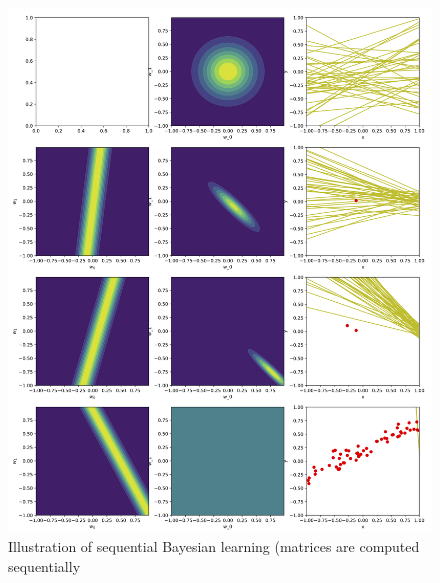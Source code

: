 \documentclass{article}
\begin{document}
\begin{figure}
	\centering
	\includegraphics[width=\textwidth]{seq_bayesl.jpg}
	\caption{Illustration of sequential Bayesian learning (matrices are computed sequentially}
	\label{seq}
\end{figure}






\end{document}
